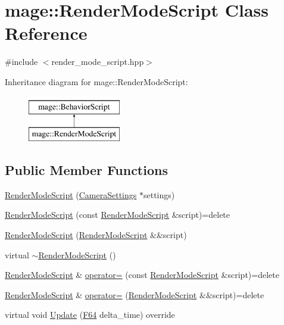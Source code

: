 \hypertarget{classmage_1_1_render_mode_script}{}\section{mage\+:\+:Render\+Mode\+Script Class Reference}
\label{classmage_1_1_render_mode_script}


{\ttfamily \#include $<$render\+\_\+mode\+\_\+script.\+hpp$>$}

Inheritance diagram for mage\+:\+:Render\+Mode\+Script\+:\begin{figure}[H]
\begin{center}
\leavevmode
\includegraphics[height=2.000000cm]{classmage_1_1_render_mode_script}
\end{center}
\end{figure}
\subsection*{Public Member Functions}
\begin{DoxyCompactItemize}
\item 
\hyperlink{classmage_1_1_render_mode_script_a313a1819a7d769199fe19a0573761e31}{Render\+Mode\+Script} (\hyperlink{structmage_1_1_camera_settings}{Camera\+Settings} $\ast$settings)
\item 
\hyperlink{classmage_1_1_render_mode_script_ac6b9d813ff57646b4bdcded5f1efdfb1}{Render\+Mode\+Script} (const \hyperlink{classmage_1_1_render_mode_script}{Render\+Mode\+Script} \&script)=delete
\item 
\hyperlink{classmage_1_1_render_mode_script_aafc57a9e0066734f91db798577ee3edb}{Render\+Mode\+Script} (\hyperlink{classmage_1_1_render_mode_script}{Render\+Mode\+Script} \&\&script)
\item 
virtual \hyperlink{classmage_1_1_render_mode_script_a9fac374686ee177e8272b4b7ea8f83a3}{$\sim$\+Render\+Mode\+Script} ()
\item 
\hyperlink{classmage_1_1_render_mode_script}{Render\+Mode\+Script} \& \hyperlink{classmage_1_1_render_mode_script_a0b81f5f341f48954e18b1a81c36a0263}{operator=} (const \hyperlink{classmage_1_1_render_mode_script}{Render\+Mode\+Script} \&script)=delete
\item 
\hyperlink{classmage_1_1_render_mode_script}{Render\+Mode\+Script} \& \hyperlink{classmage_1_1_render_mode_script_a8ca48ab27bef55314b1a822b827153b2}{operator=} (\hyperlink{classmage_1_1_render_mode_script}{Render\+Mode\+Script} \&\&script)=delete
\item 
virtual void \hyperlink{classmage_1_1_render_mode_script_a6f3d33acfda97579c767881ed976aba3}{Update} (\hyperlink{namespacemage_ad26233bbec640deda836e572c1a23708}{F64} delta\+\_\+time) override
\end{DoxyCompactItemize}
